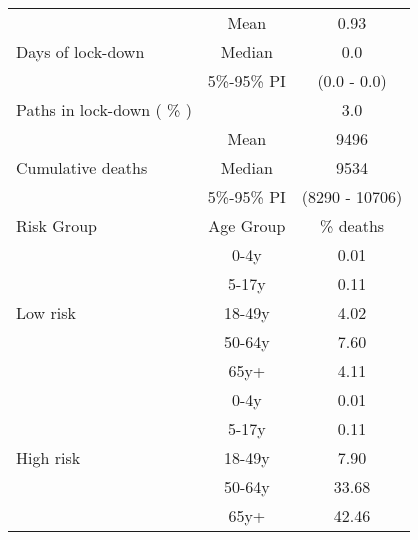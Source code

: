 \documentclass{article}
\begin{document}
\begin{table}[th]
\centering
\begin{tabular}{p{4cm}cc}
\toprule
\multirow{3}{*}{Days   of lock-down} & Mean      & 0.93                        \\ \cmidrule(l){2-3} 
                                     & Median    & 0.0                      \\ \cmidrule(l){2-3} 
                                     & 5\%-95\% PI & (0.0 - 0.0)       \\ \midrule 
\multirow{1}{*}{Paths in lock-down ( \% )} &      &         3.0              \\   \midrule                     
\multirow{3}{\hsize}{Cumulative deaths}       & Mean      & 9496 \\ \cmidrule(l){2-3} 
                                     & Median    & 9534                        \\ \cmidrule(l){2-3} 
                                     & 5\%-95\% PI & (8290 - 10706)           \\  \midrule
Risk Group                           & Age Group & \multicolumn{1}{c}{\% deaths}        \\  \midrule
\multirow{5}{*}{Low   risk}          & 0-4y      & 0.01                         \\ \cmidrule(l){2-3} 
                                     & 5-17y     & 0.11                         \\ \cmidrule(l){2-3} 
                                     & 18-49y    & 4.02                         \\ \cmidrule(l){2-3} 
                                     & 50-64y    & 7.60                         \\ \cmidrule(l){2-3} 
                                     & 65y+      & 4.11                         \\ \midrule
\multirow{5}{*}{High   risk}         & 0-4y      & 0.01                         \\ \cmidrule(l){2-3} 
                                     & 5-17y     & 0.11                         \\ \cmidrule(l){2-3} 
                                     & 18-49y    & 7.90                         \\ \cmidrule(l){2-3} 
                                     & 50-64y    & 33.68                         \\ \cmidrule(l){2-3} 
                                     & 65y+      & 42.46                         \\ \midrule

\end{tabular}
\end{table}
\end{document}
